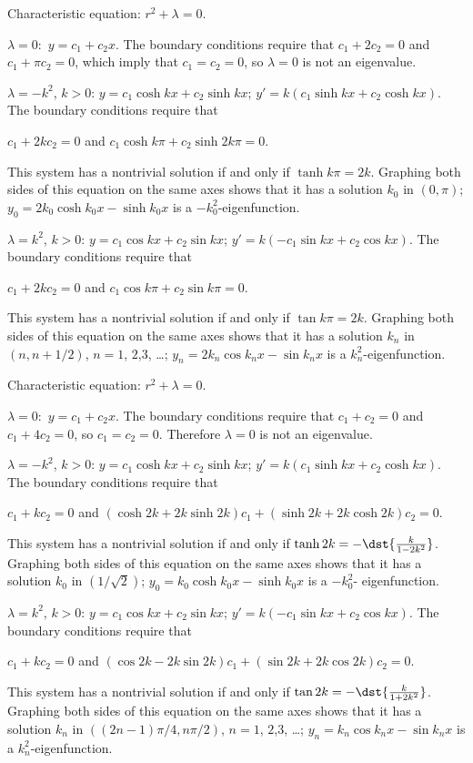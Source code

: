 \documentclass[dvips]{book}
\renewcommand{\exer}[1]{\par\medskip\;\noindent{\color{red}\bf #1.}}
\numberwithin{example}{section}
\numberwithin{equation}{section}
\numberwithin{theorem}{section}
\numberwithin{table}{section}
\numberwithin{figure}{section}
\begin{document}
\exer{13.2.14}
Characteristic equation: $r^{2}+\lambda=0$.

$\lambda=0:$
 $y=c_{1}+c_{2}x$. The boundary conditions require  that
$c_{1}+2c_{2}=0$ and $c_{1}+\pi c_{2}=0$, which imply that
$c_{1}=c_{2}=0$, so $\lambda=0$ is not an eigenvalue.

$\lambda=-k^{2}$, $k>0$:
$y=c_{1}\cosh kx+c_{2}\sinh kx$; $y'=k(c_{1}\sinh kx+c_{2}\cosh
kx)$.
 The boundary conditions require that  \\
\centerline{$c_{1}+2kc_{2}=0$  \;  and \;  $c_{1}\cosh
k\pi+c_{2}\sinh 2k\pi=0$.}
\noindent
This system
has a nontrivial solution if and only if $\tanh k\pi=2k$.
 Graphing
both sides of this equation on the same axes shows that it has
a solution $k_{0}$ in $(0,\pi)$;
$y_{0}=2k_{0}\cosh k_{0}x-\sinh k_{0}x$ is a
$-k_{0}^{2}$-eigenfunction.



$\lambda=k^{2}$, $k>0$:
 $y=c_{1}\cos kx+c_{2}\sin kx$; $y'=k(-c_{1}\sin kx+c_{2}\cos
kx)$.
 The boundary conditions require that    \\
\centerline{$c_{1}+2kc_{2}=0$\; and \;$c_{1}\cos k\pi+c_{2}\sin k\pi=0$.}
\noindent
This system has
 a nontrivial solution if and only if $\tan k\pi=2k$.
Graphing both sides of this equation on the same axes shows that it
has a solution $k_{n}$ in $(n, n+1/2)$, $n=1$, $2$,$3$, \dots;
$y_{n}=2k_{n} \cos k_{n}x-\sin k_{n}x$ is a $k_{n}^{2}$-eigenfunction.





\exer{13.2.16}
Characteristic equation: $r^{2}+\lambda=0$.

$\lambda=0:$
$y=c_{1}+c_{2}x$. The  boundary conditions require that $c_{1}+c_{2}=0$
and
$c_{1}+4c_{2}=0$, so $c_{1}=c_{2}=0$.
Therefore  $\lambda=0$
is not an eigenvalue.


$\lambda=-k^{2}$, $k>0$:
 $y=c_{1}\cosh kx+c_{2}\sinh kx$; $y'=k(c_{1}\sinh kx+c_{2}\cosh
kx)$.  The boundary conditions require that\\
\centerline{$c_{1}+kc_{2}=0$ \; and  \;
$(\cosh 2k+2k\sinh 2k)c_{1}+(\sinh 2k+2k\cosh 2k)c_{2}=0$.}
\noindent
This system has
a  nontrivial solution if and only if
 $\tanh 2k =-\dst{\frac{k}{1-2k^{2}}}$.
 Graphing
both sides of this equation on the same axes shows that it has a
solution $k_{0}$ in $(1/\sqrt2)$; $y_{0}=k_{0}\cosh k_{0}x-\sinh k_{0}x$ is
a  $-k_{0}^{2}$- eigenfunction.



$\lambda=k^{2}$, $k>0$:
 $y=c_{1}\cos kx+c_{2}\sin kx$; $y'=k(-c_{1}\sin kx+c_{2}\cos
kx)$.  The boundary conditions require that  \\
\centerline{$c_{1}+kc_{2}=0$ \; and \;
$(\cos 2k-2k\sin 2k)c_{1}+(\sin 2k+2k\cos 2k)c_{2}=0$.}
\noindent
This system has  a
nontrivial solution if and only if
 $\tan 2k =-\dst{\frac{k}{1+2k^{2}}}$.
 Graphing
both sides of this equation on the same axes shows that it has
a solution $k_{n}$ in $((2n-1)\pi/4,n\pi/2)$, $n=1$, $2$,$3$, \dots;
$y_{n}=k_{n} \cos k_{n}x-\sin k_{n}x$ is a $k_{n}^{2}$-eigenfunction.
\end{document}
